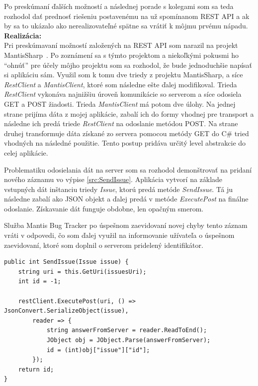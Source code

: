 \documentclass[slovak, bachelorpractice]{diploma}
\begin{document}
Po preskúmaní ďalších možností a následnej porade s kolegami som sa teda rozhodol dať prednosť riešeniu postavenému na už spomínanom REST API a ak by sa to ukázalo ako nerealizovateľné spätne sa vrátiť k môjmu prvému nápadu.
\\
\textbf{Realizácia:} \\ Pri preskúmavaní možností založených na REST API som narazil na projekt \mbox{MantisSharp \cite{MantisSharp}}. Po zoznámení sa s týmto projektom a niekoľkými pokusmi ho \enquote{ohnúť} pre účely môjho projektu som sa rozhodol, že bude jednoduchšie napísať si aplikáciu sám. Využil som k tomu dve triedy z projektu MantisSharp, a síce \textit{RestClient} a \textit{MantisClient}, ktoré som následne ešte ďalej modifikoval. Trieda \textit{RestClient} vykonáva najnižšiu úroveň komunikácie so serverom a síce odosiela GET a POST žiadosti. Trieda \textit{MantisClient} má potom dve úlohy. Na jednej strane prijíma dáta z mojej aplikácie, zabalí ich do formy vhodnej pre transport a následne ich predá triede \textit{RestClient} na odoslanie metódou POST. Na strane druhej transformuje dáta získané zo servera pomocou metódy GET do C\# tried vhodných na následné použitie. Tento postup pridáva určitý level abstrakcie do celej aplikácie.

Problematiku odosielania dát na server som sa rozhodol demonštrovať na pridaní nového záznamu vo výpise \ref{src:SendIssue}. Aplikácia vytvorí na základe vstupných dát inštanciu triedy \textit{Issue}, ktorú predá metóde \textit{SendIssue}. Tá ju následne zabalí ako JSON objekt a ďalej predá v metóde \textit{ExecutePost} na finálne odoslanie. Získavanie dát funguje obdobne, len opačným smerom. 

Služba Mantis Bug Tracker po úspešnom zaevidovaní novej chyby tento záznam vráti v odpovedi, čo som ďalej využil na informovanie užívateľa o úspešnom zaevidovaní, ktoré som doplnil o serverom pridelený identifikátor.
\vspace{10pt}
\begin{lstlisting}[label=src:SendIssue,caption={Programové odoslanie záznamu o chybe do služby Mantis Bug Tracker}]
public int SendIssue(Issue issue) {
	string uri = this.GetUri(issuesUri);
	int id = -1;
	
	restClient.ExecutePost(uri, () => JsonConvert.SerializeObject(issue),
        reader => {
            string answerFromServer = reader.ReadToEnd();
            JObject obj = JObject.Parse(answerFromServer);
            id = (int)obj["issue"]["id"];
        });
    return id;
}
\end{lstlisting}
\end{document}

